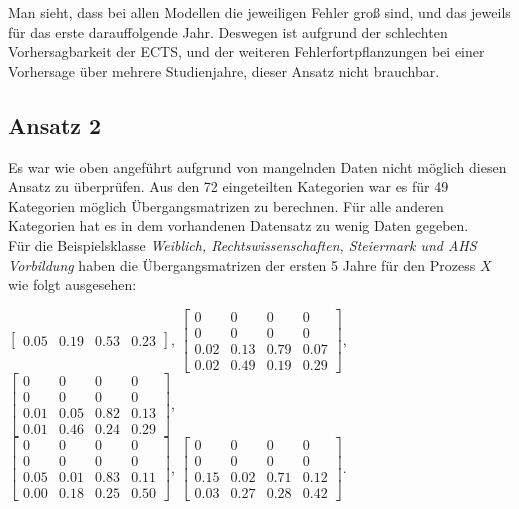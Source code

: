 \noindent Man sieht, dass bei allen Modellen die jeweiligen Fehler gro{\ss} sind, und das jeweils f\"ur das erste darauffolgende Jahr.
Deswegen ist aufgrund der schlechten Vorhersagbarkeit der ECTS, und der weiteren Fehlerfortpflanzungen bei einer Vorhersage \"uber mehrere Studienjahre, 
dieser Ansatz nicht brauchbar. \\










\subsection{Ansatz 2}
Es war wie oben angef\"uhrt aufgrund von mangelnden Daten nicht m\"oglich diesen Ansatz zu \"uberpr\"ufen. 
Aus den 72 eingeteilten Kategorien war es f\"ur 49 Kategorien m\"oglich \"Ubergangsmatrizen zu berechnen. F\"ur alle anderen 
Kategorien hat es in dem vorhandenen Datensatz zu wenig Daten gegeben. \\ 

F\"ur die Beispielsklasse \textit{Weiblich, Rechtswissenschaften, Steiermark und AHS Vorbildung} haben die \"Ubergangsmatrizen der ersten 5 Jahre f\"ur den Prozess $X$ wie folgt ausgesehen: 

$\left[ \begin{array}{rrrr}  0.05 & 0.19 & 0.53 & 0.23  \end{array}\right]$, $\left[ \begin{array}{rrrr} 0 & 0 & 0 & 0 \\  0 & 0 & 0 & 0 \\ 0.02 & 0.13 & 0.79 & 0.07 \\ 0.02 & 0.49 & 0.19 & 0.29 \end{array}\right]$, 
$\left[ \begin{array}{rrrr} 0 & 0 & 0 & 0 \\  0 & 0 & 0 & 0 \\ 0.01 & 0.05  & 0.82  & 0.13 \\ 0.01 & 0.46 & 0.24 & 0.29 \end{array}\right]$, \\ 

$\left[ \begin{array}{rrrr} 0 & 0 & 0 & 0 \\  0 & 0 & 0 & 0 \\ 0.05 & 0.01 & 0.83 & 0.11\\ 0.00& 0.18 & 0.25 & 0.50\end{array}\right]$,
$\left[ \begin{array}{rrrr} 0 & 0 & 0 & 0 \\  0 & 0 & 0 & 0 \\ 0.15& 0.02& 0.71& 0.12\\ 0.03& 0.27& 0.28& 0.42 \end{array}\right]$. 

